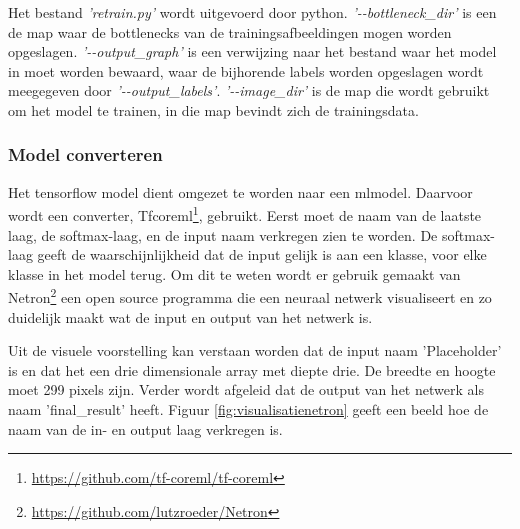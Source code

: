 
Het bestand \textit{'retrain.py'} wordt uitgevoerd door python. \textit{'-\phantom{}-bottleneck\_dir'} is een de map waar de bottlenecks van de trainingsafbeeldingen mogen worden opgeslagen.  \textit{'-\phantom{}-output\_graph'} is een verwijzing naar het bestand waar het model in moet worden bewaard, waar de bijhorende labels worden opgeslagen wordt meegegeven door  \textit{'-\phantom{}-output\_labels'}.  \textit{'-\phantom{}-image\_dir'} is de map die wordt gebruikt om het model te trainen, in die map bevindt zich de trainingsdata. 

\subsubsection{Model converteren}
\label{sssec:Model converteren}

Het tensorflow model dient omgezet te worden naar een mlmodel. Daarvoor wordt een converter, Tfcoreml\footnote{\url{https://github.com/tf-coreml/tf-coreml}}, gebruikt. Eerst moet de naam van de laatste laag, de softmax-laag, en de input naam verkregen zien te worden. De softmax-laag geeft de waarschijnlijkheid dat de input gelijk is aan een klasse, voor elke klasse in het model terug. Om dit te weten wordt er gebruik gemaakt van Netron\footnote{\url{https://github.com/lutzroeder/Netron}} een open source programma die een neuraal netwerk visualiseert en zo duidelijk maakt wat de input en output van het netwerk is. 

Uit de visuele voorstelling kan verstaan worden dat de input naam 'Placeholder' is en dat het een drie dimensionale array met diepte drie. De breedte en hoogte moet 299 pixels zijn. Verder wordt afgeleid dat de output van het netwerk als naam 'final\_result' heeft. Figuur \ref{fig:visualisatienetron} geeft een beeld hoe de naam van de in- en output laag verkregen is.

